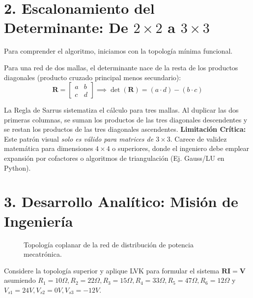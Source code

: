 \documentclass[11pt,a4paper]{article}
\begin{document}
\section*{2. Escalonamiento del Determinante: De $2\times2$ a $3\times3$}

Para comprender el algoritmo, iniciamos con la topología mínima funcional.

\begin{tcolorbox}[colback=blue!5!white,colframe=UCBblue,title=\textbf{A. Concepto Base (Matriz $2\times2$)}]
Para una red de dos mallas, el determinante nace de la resta de los productos diagonales (producto cruzado principal menos secundario):
$$ \mathbf{R} = \begin{bmatrix} a & b \\ c & d \end{bmatrix} \implies \det(\mathbf{R}) = (a \cdot d) - (b \cdot c) $$
\end{tcolorbox}

\begin{tcolorbox}[colback=blue!5!white,colframe=UCBblue,title=\textbf{B. Expansión Visual a $3\times3$ (Regla de Sarrus)}]
La Regla de Sarrus sistematiza el cálculo para tres mallas. Al duplicar las dos primeras columnas, se suman los productos de las tres diagonales descendentes y se restan los productos de las tres diagonales ascendentes.
\textbf{Limitación Crítica:} Este patrón visual \textit{solo es válido para matrices de $3\times3$}. Carece de validez matemática para dimensiones $4\times4$ o superiores, donde el ingeniero debe emplear expansión por cofactores o algoritmos de triangulación (Ej. Gauss/LU en Python).
\end{tcolorbox}

\newpage

\section*{3. Desarrollo Analítico: Misión de Ingeniería}

\begin{figure}[h!]
    \centering
    \caption{Topología coplanar de la red de distribución de potencia mecatrónica.}
\end{figure}

Considere la topología superior y aplique LVK para formular el sistema $\mathbf{R}\mathbf{I} = \mathbf{V}$ asumiendo $R_1=10\Omega, R_2=22\Omega, R_3=15\Omega, R_4=33\Omega, R_5=47\Omega, R_6=12\Omega$ y $V_{s1}=24V, V_{s2}=0V, V_{s3}=-12V$.
\end{document}
